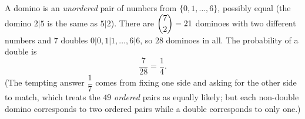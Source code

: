 A domino is an \emph{unordered} pair of numbers from $\{0,1,\dots,6\}$, possibly equal (the domino $2|5$ is the same as $5|2$). There are $\dbinom72=21$ dominoes with two different numbers and $7$ doubles $0|0,1|1,\dots,6|6$, so $28$ dominoes in all. The probability of a double is
\[
\dfrac{7}{28}=\boxed{\dfrac{1}{4}}.
\]
(The tempting answer $\dfrac{1}{7}$ comes from fixing one side and asking for the other side to match, which treats the $49$ \emph{ordered} pairs as equally likely; but each non-double domino corresponds to two ordered pairs while a double corresponds to only one.)
